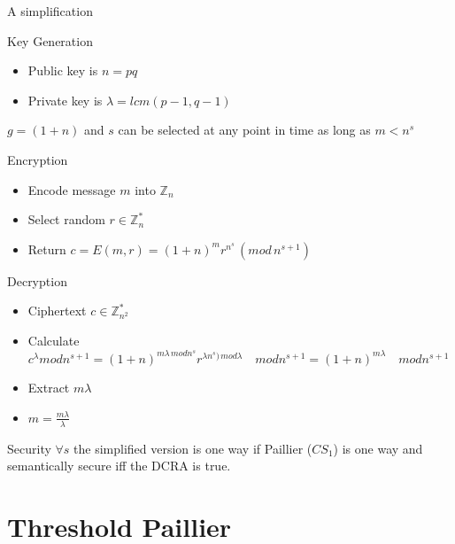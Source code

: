 \documentclass{beamer}
\begin{document}
\begin{frame}[allowframebreaks]{A simplification}

\begin{block}{Key Generation}
\begin{itemize}
\item Public key is $n=p  q$
\item Private key is $\lambda = lcm (p-1, q-1)$
\end{itemize}
$g = (1+n)$ and $s$ can be selected at any point in time as long as $ m < n^s$
\end{block}

\begin{block}{Encryption}
\begin{itemize}
\item Encode message $m$ into $\mathbb{Z}_n$
\item Select random $r \in \mathbb{Z}^*_n$
\item Return $c = E(m,r) = (1+n)^m  r^{n^s} \, ( mod \, n^{s+1} )$
\end{itemize}
\end{block}

\begin{block}{Decryption}
\begin{itemize}
\item Ciphertext $c \in \mathbb{Z}^*_{n^2}$
\item Calculate $c^\lambda mod n^{s+1} = (1+n)^{m  \lambda \, mod n^s}  r^{\lambda  n^s) \, mod \lambda} \quad mod n^{s+1} = (1+n)^{m  \lambda} \quad mod n^{s+1} $
\item  Extract $m  \lambda$
\item  $ m = \frac{m  \lambda}{\lambda}$
\end{itemize}
\end{block}

\begin{block}{Security}
$\forall s$ the simplified version is one way if Paillier ($CS_1$) is one way and semantically secure iff the DCRA is true.
\end{block}

\end{frame} 

\section{Threshold Paillier}
\end{document}
